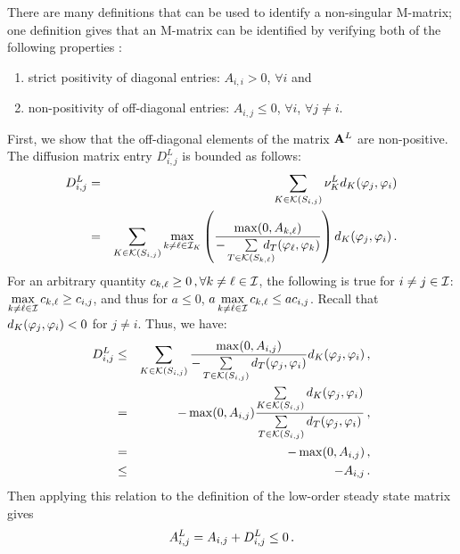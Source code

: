 
\begin{prf}
  There are many definitions that can be used to identify a non-singular
  M-matrix; one
  definition gives that an M-matrix can be identified by verifying both of the
  following properties \cite{plemmons}:
  \begin{enumerate}
    \item strict positivity of diagonal entries: $A_{i,i} > 0$, $\forall i$ and
    \item non-positivity of off-diagonal entries: $A_{i,j} \leq 0$,
      $\forall i$, $\forall j\ne i$.
  \end{enumerate}
First, we show that the off-diagonal elements of the matrix
$\A^L$ are non-positive.
The diffusion matrix entry $D^L_{i,j}$ is bounded as follows:
\begin{eqnarray*}
   D_{i,j}^L & = & \sumKSij\nu^L_K d_K(\test_j,\test_i)\\
          & = & \sumKSij\max\limits_{k\ne \ell\in \indices_K}
            \pr{\frac{\max(0,A_{k,\ell})}
              {-\sum\limits_{T\in\mathcal{K}(S_{k,\ell})}
              \mkern-20mu d_T(\test_\ell,\test_k)}} d_K(\test_j,\test_i) \eqp
\end{eqnarray*}
For an arbitrary quantity $c_{k,\ell} \geq 0 \eqc \forall k\ne\ell\in\indices$,
the following is true for $i\ne j\in\indices$:
$\max\limits_{k\ne\ell\in\indices}c_{k,\ell} \geq c_{i,j}$, and thus for $a\leq 0$,
$a\max\limits_{k\ne\ell\in\indices}c_{k,\ell} \leq a c_{i,j}$.
Recall that $d_K(\test_j,\test_i) < 0$ for $j\ne i$.
Thus, we have:
\begin{eqnarray*}
   D^L_{i,j} & \le & \sumKSij \frac{\max(0,A_{i,j})}
    {-\sumKSij[T] d_T(\test_j,\test_i)}
    d_K(\test_j,\test_i) \eqc\\
      & = & -\max(0,A_{i,j}) \frac{\sumKSij d_K(\test_j,\test_i)}
        {\sumKSij[T] d_T(\test_j,\test_i)} \eqc\\
        & = & -\max(0,A_{i,j}) \eqc\\
        & \le & -A_{i,j} \eqp
\end{eqnarray*}
Then applying this relation to the definition of the low-order steady state
matrix gives
\begin{equation*}
  A^L_{i,j}  =   A_{i,j} + D_{i,j}^L  \le 0  \eqp
\end{equation*}

\end{prf}
